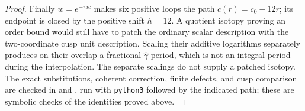 \begin{proof}
Finally \(w=e^{-\pi i c}\) makes six positive loops the path
\(c(r)=c_0-12r\); its endpoint is closed by the positive shift
\(h=12\). A quotient isotopy proving an order bound would still
have to patch the ordinary scalar description with the two-coordinate
cusp unit description. Scaling their additive logarithms separately
produces on their overlap a fractional
\(\widehat\gamma\)-period, which is not an integral period during
the interpolation. The separate scalings do not supply a patched isotopy. The
exact substitutions, coherent correction, finite defects, and
cusp comparison are checked in
 and
, run with \texttt{python3} followed by the indicated path; these are symbolic checks of the
identities proved above.
\end{proof}